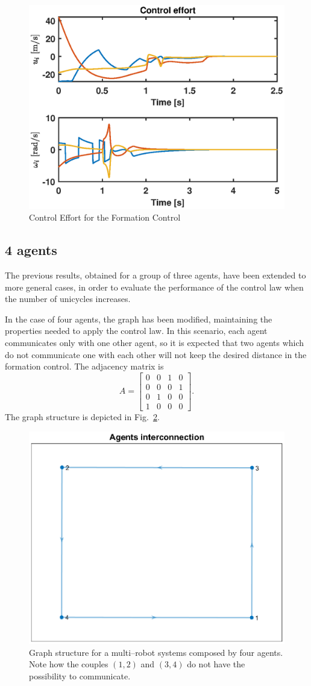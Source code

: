 \documentclass[11pt]{article}
\begin{document}
\begin{figure}[H]
\centering
\includegraphics[width=.6\textwidth]{Images/3Agents/Control_Rendezvous_Keeping_Distance.eps}
\caption{Control Effort for the Formation Control}
\label{Contr_3_Form}
\end{figure}

\subsection*{4 agents}

The previous results, obtained for a group of three agents, have been extended to more general cases, in order to evaluate the performance of the control law when the number of unicycles increases.

In the case of four agents, the graph has been modified, maintaining the properties needed to apply the control law. In this scenario, each agent communicates only with one other agent, so it is expected that two agents which do not communicate one with each other will not keep the desired distance in the formation control. The adjacency matrix is
\[
A =
\begin{bmatrix}
0 & 0 & 1 & 0 \\
0 & 0 & 0 & 1 \\
0 & 1 & 0 & 0 \\
1 & 0 & 0 & 0 
\end{bmatrix}.
\]
The graph structure is depicted in Fig.~\ref{graph_4}.

\begin{figure}[H]
\centering
\includegraphics[width=.6\textwidth]{Images/4agents/Graph}
\caption{Graph structure for a multi--robot systems composed by four agents. Note how the couples $(1,2)$ and $(3,4)$ do not have the possibility to communicate.}
\label{graph_4}
\end{figure}
\end{document}
